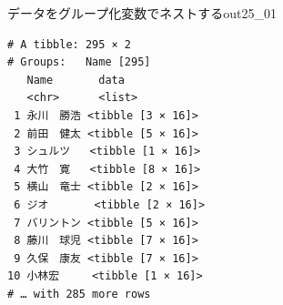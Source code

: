 \begin{Rscreen}{データをグループ化変数でネストする}{out25_01}
	\begin{verbatim}
# A tibble: 295 × 2
# Groups:   Name [295]
   Name       data             
   <chr>      <list>           
 1 永川　勝浩 <tibble [3 × 16]>
 2 前田　健太 <tibble [5 × 16]>
 3 シュルツ   <tibble [1 × 16]>
 4 大竹　寛   <tibble [8 × 16]>
 5 横山　竜士 <tibble [2 × 16]>
 6 ジオ       <tibble [2 × 16]>
 7 バリントン <tibble [5 × 16]>
 8 藤川　球児 <tibble [7 × 16]>
 9 久保　康友 <tibble [7 × 16]>
10 小林宏     <tibble [1 × 16]>
# … with 285 more rows
\end{verbatim}
\end{Rscreen}
